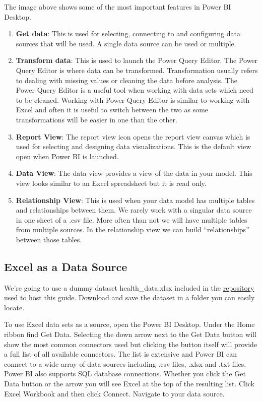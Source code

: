 \documentclass[
]{book}
\begin{document}
The image above shows some of the most important features in Power BI Desktop.

\begin{enumerate}
\def\labelenumi{\arabic{enumi}.}
\item
  \textbf{Get data}: This is used for selecting, connecting to and configuring data sources that will be used. A single data source can be used or multiple.
\item
  \textbf{Transform data}: This is used to launch the Power Query Editor. The Power Query Editor is where data can be transformed. Transformation usually refers to dealing with missing values or cleaning the data before analysis. The Power Query Editor is a useful tool when working with data sets which need to be cleaned. Working with Power Query Editor is similar to working with Excel and often it is useful to switch between the two as some transformations will be easier in one than the other.
\item
  \textbf{Report View}: The report view icon opens the report view canvas which is used for selecting and designing data visualizations. This is the default view open when Power BI is launched.
\item
  \textbf{Data View}: The data view provides a view of the data in your model. This view looks similar to an Excel spreadsheet but it is read only.
\item
  \textbf{Relationship View}: This is used when your data model has multiple tables and relationships between them. We rarely work with a singular data source in one sheet of a .csv file. More often than not we will have multiple tables from multiple sources. In the relationship view we can build ``relationships'' between those tables.
\end{enumerate}

\hypertarget{excel-as-a-data-source}{%
\subsection{Excel as a Data Source}\label{excel-as-a-data-source}}

We're going to use a dummy dataset health\_data.xlsx included in the \href{https://github.com/aamcmurray/BookTest/blob/main/health_data.xlsx}{repository used to host this guide}. Download and save the dataset in a folder you can easily locate.

To use Excel data sets as a source, open the Power BI Desktop. Under the Home ribbon find Get Data. Selecting the down arrow next to the Get Data button will show the most common connectors used but clicking the button itself will provide a full list of all available connectors. The list is extensive and Power BI can connect to a wide array of data sources including .csv files, .xlsx and .txt files. Power BI also supports SQL database connections. Whether you click the Get Data button or the arrow you will see Excel at the top of the resulting list. Click Excel Workbook and then click Connect. Navigate to your data source.
\end{document}
